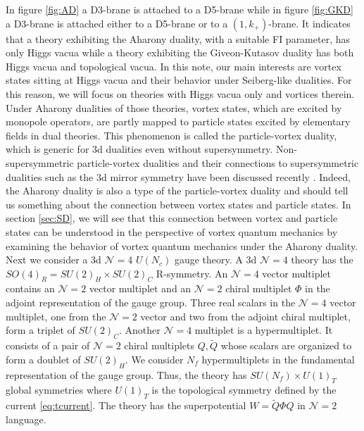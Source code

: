 \documentclass[a4paper,11pt]{article}
\begin{document}
In figure \ref{fig:AD} a D3-brane is attached to a D5-brane while in figure \ref{fig:GKD} a D3-brane is attached either to a D5-brane or to a $(1,k_+)$-brane. It indicates that a theory exhibiting the Aharony duality, with a suitable FI parameter, has only Higgs vacua while a theory exhibiting the Giveon-Kutasov duality has both Higgs vacua and topological vacua. In this note, our main interests are vortex states sitting at Higgs vacua and their behavior under Seiberg-like dualities. For this reason, we will focus on theories with Higgs vacua only and vortices therein. Under Aharony dualities of those theories, vortex states, which are excited by monopole operators, are partly mapped to particle states excited by elementary fields in dual theories. This phenomenon is called the particle-vortex duality, which is generic for 3d dualities even without supersymmetry. Non-supersymmetric particle-vortex dualities \cite{Peskin1978122,PhysRevLett.47.1556,Son:2015xqa,2015PhRvX...5d1031W,Metlitski:2015eka} and their connections to supersymmetric dualities such as the 3d mirror symmetry \cite{Intriligator:1996ex,Aharony:1997bx,Kapustin:1999ha} have been discussed recently \cite{Karch:2016sxi,Murugan:2016zal,Seiberg:2016gmd,Kachru:2016rui,Kachru:2016aon}. Indeed, the Aharony duality is also a type of the particle-vortex duality and should tell us something about the connection between vortex states and particle states. In section \ref{sec:SD}, we will see that this connection between vortex and particle states can be understood in the perspective of vortex quantum mechanics by examining the behavior of vortex quantum mechanics under the Aharony duality.
\\


Next we consider a 3d $\mathcal N = 4$ $U(N_c)$ gauge theory. A 3d $\mathcal N = 4$ theory has the $SO(4)_R = SU(2)_H \times SU(2)_C$ R-symmetry. An $\mathcal N = 4$ vector multiplet contains an $\mathcal N = 2$ vector multiplet and an $\mathcal N = 2$ chiral multiplet $\Phi$ in the adjoint representation of the gauge group. Three real scalars in the $\mathcal N = 4$ vector multiplet, one from the $\mathcal N = 2$ vector and two from the adjoint chiral multiplet, form a triplet of $SU(2)_C$. Another $\mathcal N = 4$ multiplet is a hypermultiplet. It consists of a pair of $\mathcal N = 2$ chiral multiplets $Q,\tilde Q$ whose scalars are organized to form a doublet of $SU(2)_H$. We consider $N_f$ hypermultiplets in the fundamental representation of the gauge group. Thus, the theory has $SU(N_f) \times U(1)_T$ global symmetries where $U(1)_T$ is the topological symmetry defined by the current \eqref{eq:tcurrent}. The theory has the superpotential $W = \tilde Q \Phi Q$ in $\mathcal N = 2$ language.
\\
\end{document}
